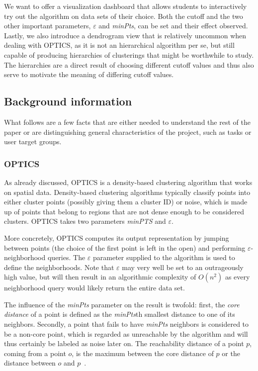 \documentclass{vgtc} %
\begin{document}
We want to offer a visualization dashboard that allows students to
interactively try out the algorithm on data sets of their choice. Both the
cutoff and the two other important parameters, $\varepsilon$ and \emph{minPts}, can
be set and their effect observed. Lastly, we also introduce a dendrogram view
that is relatively uncommon when dealing with OPTICS, as it is not an hierarchical
algorithm per se, but still capable of producing hierarchies of clusterings
that might be worthwhile to study. The hierarchies are a direct result of
choosing different cutoff values and thus also serve to motivate the meaning of
differing cutoff values.

\subsection{Background information}

What follows are a few facts that are either needed to understand the rest
of the paper or are distinguishing general characteristics of the project,
such as tasks or user target groups.

\subsubsection{OPTICS}

As already discussed, OPTICS is a density-based clustering algorithm that works
on spatial data. Density-based clustering algorithms typically classify points
into either cluster points (possibly giving them a cluster ID) or noise, which
is made up of points that belong to regions that are not dense enough to be
considered clusters. OPTICS takes two parameters \emph{minPTS} and $\varepsilon$.

More concretely, OPTICS computes its output representation by jumping between
points (the choice of the first point is left in the open) and performing
$\varepsilon$-neighborhood queries. The $\varepsilon$ parameter supplied to the
algorithm is used to define the neighborhoods. Note that $\varepsilon$ may very
well be set to an outrageously high value, but will then result in an
algorithmic complexity of $O(n^2)$ as every neighborhood query would likely
return the entire data set.

The influence of the \emph{minPts} parameter on the result is twofold: first,
the \emph{core distance} of a point is defined as the \emph{minPts}th smallest
distance to one of its neighbors. Secondly, a point that fails to have
\emph{minPts} neighbors is considered to be a non-core point, which is regarded
as unreachable by the algorithm and will thus certainly be labeled as noise
later on. The reachability distance of a point $p$, coming from a point $o$, is
the maximum between the core distance of $p$ or the distance between $o$ and
$p$~\cite{optics-wiki}.
\end{document}
